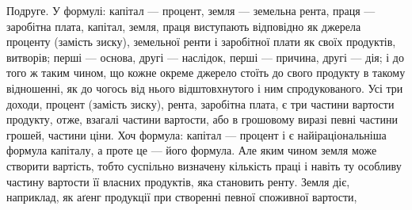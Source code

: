 Подруге. У формулі: капітал — процент, земля — земельна рента, праця —
заробітна плата, капітал, земля, праця виступають відповідно як джерела проценту
(замість зиску), земельної ренти і заробітної плати як своїх продуктів,
витворів; перші — основа, другі — наслідок, перші — причина, другі — дія; і до
того ж таким чином, що кожне окреме джерело стоїть до свого продукту в такому
відношенні, як до чогось від нього відштовхнутого і ним спродукованого.
Усі три доходи, процент (замість зиску), рента, заробітна плата, є три частини
вартости продукту, отже, взагалі частини вартости, або в грошовому виразі
певні частини грошей, частини ціни. Хоч формула: капітал — процент і є найіраціональніша формула
капіталу, а проте це — його формула. Але яким чином
земля може створити вартість, тобто суспільно визначену кількість праці і навіть
ту особливу частину вартости її власних продуктів, яка становить ренту. Земля
діє, наприклад, як аґенг продукції при створенні певної споживної вартости,
\parbreak{}  %
